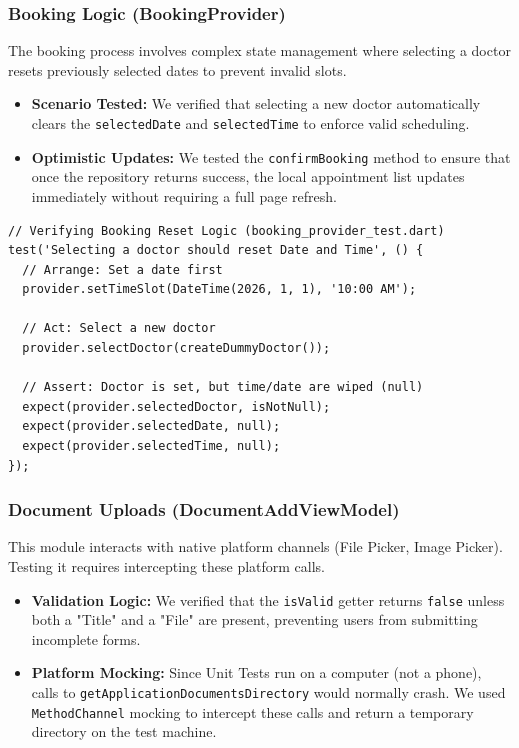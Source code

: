 \subsubsection{Booking Logic (BookingProvider)}
The booking process involves complex state management where selecting a doctor
resets previously selected dates to prevent invalid slots.
\begin{itemize}
    \item \textbf{Scenario Tested:} We verified that selecting a new doctor automatically clears the \texttt{selectedDate} and \texttt{selectedTime} to enforce valid scheduling.
    \item \textbf{Optimistic Updates:} We tested the \texttt{confirmBooking} method to ensure that once the repository returns success, the local appointment list updates immediately without requiring a full page refresh.
\end{itemize}

\begin{verbatim}
// Verifying Booking Reset Logic (booking_provider_test.dart)
test('Selecting a doctor should reset Date and Time', () {
  // Arrange: Set a date first
  provider.setTimeSlot(DateTime(2026, 1, 1), '10:00 AM');
  
  // Act: Select a new doctor
  provider.selectDoctor(createDummyDoctor());

  // Assert: Doctor is set, but time/date are wiped (null)
  expect(provider.selectedDoctor, isNotNull);
  expect(provider.selectedDate, null);
  expect(provider.selectedTime, null);
});
\end{verbatim}

\subsubsection{Document Uploads (DocumentAddViewModel)}
This module interacts with native platform channels (File Picker, Image
Picker). Testing it requires intercepting these platform calls.
\begin{itemize}
    \item \textbf{Validation Logic:} We verified that the \texttt{isValid} getter returns \texttt{false} unless both a "Title" and a "File" are present, preventing users from submitting incomplete forms.
    \item \textbf{Platform Mocking:} Since Unit Tests run on a computer (not a phone), calls to
    \texttt{getApplicationDocumentsDirectory} would normally crash.\newline
    We used \texttt{MethodChannel} mocking to intercept these calls and return a
    temporary directory on the test machine.
\end{itemize}

